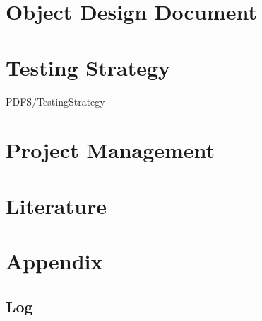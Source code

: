 \documentclass{article}
\begin{document}
\section{Object Design Document}
	
\section{Testing Strategy}
	 {PDFS/TestingStrategy}
\section{Project Management}
	

\section{Literature }

\section{Appendix}
\subsection{Log}
	
\end{document}
